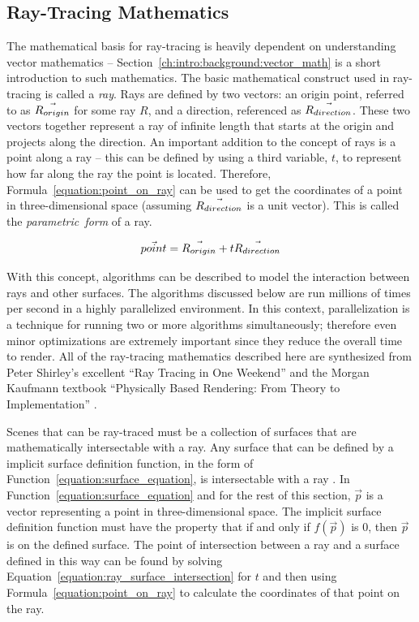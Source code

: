 \subsection{Ray-Tracing Mathematics}
\label{ch:intro:background:raytracing_math}
The mathematical basis for ray-tracing is heavily dependent on understanding vector mathematics -- Section~\ref{ch:intro:background:vector_math} is a short introduction to such mathematics.
The basic mathematical construct used in ray-tracing is called a {\it ray}. Rays are defined by two vectors: an origin point, referred to as $\vec{R_{origin}}$ for some ray $R$, and a direction, referenced as $\vec{R_{direction}}$.
These two vectors together represent a ray of infinite length that starts at the origin and projects along the direction.
An important addition to the concept of rays is a point along a ray -- this can be defined by using a third variable, $t$, to represent how far along the ray the point is located.
Therefore, Formula~\ref{equation:point_on_ray} can be used to get the coordinates of a point in three-dimensional space (assuming $\vec{R_{direction}}$ is a unit vector).
This is called the {\it parametric~form} of a ray.

\begin{equation}
  \label{equation:point_on_ray}
  \vec{point} = \vec{R_{origin}} + t\vec{R_{direction}}
\end{equation}


With this concept, algorithms can be described to model the interaction between rays and other surfaces. The algorithms discussed below are run millions of times per second in a highly parallelized environment.
In this context, parallelization is a technique for running two or more algorithms simultaneously; therefore even minor optimizations are extremely important since they reduce the overall time to render.
All of the ray-tracing mathematics described here are synthesized from Peter Shirley's excellent ``Ray Tracing in One Weekend'' \cite{shirley2016ray} and the Morgan Kaufmann textbook ``Physically Based Rendering: From Theory to Implementation'' \cite{pharr2016physically}.

Scenes that can be ray-traced must be a collection of surfaces that are mathematically intersectable with a ray.
Any surface that can be defined by a implicit surface definition function, in the form of Function~\ref{equation:surface_equation}, is intersectable with a ray \cite{pharr2016physically}.
In Function~\ref{equation:surface_equation} and for the rest of this section, $\vec{p}$ is a vector representing a point in three-dimensional space.
The implicit surface definition function must have the property that if and only if $f(\vec{p})$ is $0$, then $\vec{p}$ is on the defined surface.
The point of intersection between a ray and a surface defined in this way can be found by solving Equation~\ref{equation:ray_surface_intersection} for $t$ and then using Formula~\ref{equation:point_on_ray} to calculate the coordinates of that point on the ray.


